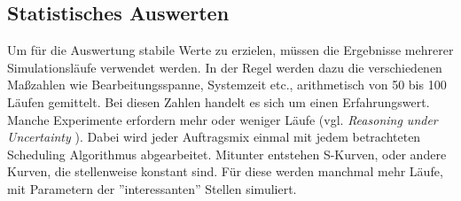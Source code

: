 \subsection{Statistisches Auswerten}
Um für die Auswertung stabile Werte zu erzielen, müssen die Ergebnisse mehrerer Simulationsläufe verwendet werden. In der Regel werden dazu die verschiedenen Maßzahlen wie Bearbeitungsspanne, Systemzeit etc., arithmetisch von 50 bis 100 Läufen gemittelt. Bei diesen Zahlen handelt es sich um einen Erfahrungswert. Manche Experimente erfordern mehr oder weniger Läufe (vgl. \emph{Reasoning under Uncertainty} \cite{SimUncertainty}). Dabei wird jeder Auftragsmix einmal mit jedem betrachteten Scheduling Algorithmus abgearbeitet. Mitunter entstehen S-Kurven, oder andere Kurven, die stellenweise konstant sind. Für diese werden manchmal mehr Läufe, mit Parametern der ''interessanten'' Stellen simuliert.



